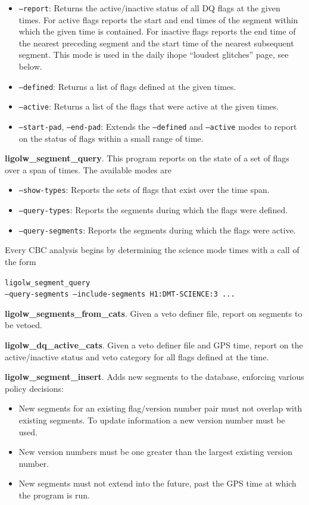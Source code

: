 \begin{itemize}
\item \texttt{--report}:  Returns the active/inactive status of all DQ flags at the
given times.  For active flags reports the start and end times of the
segment within which the given time is contained.  For inactive flags
reports the end time of the nearest preceding segment and the start
time of the nearest subsequent segment.  This mode is used in the
daily ihope ``loudest glitches'' page, see below.
\item \texttt{--defined}: Returns a list of flags defined at the
given times.
\item \texttt{--active}: Returns a list of the flags that were active
at the given times.
\item \texttt{--start-pad}, \texttt{--end-pad}: Extends the
\texttt{--defined} and \texttt{--active} modes to report on the status
of flags within a small range of time.
\end{itemize}


\textbf{ligolw\_segment\_query}.  This program reports on the state of a
set of flags over a span of times.  The available modes are

\begin{itemize}
\item \texttt{--show-types}: Reports the sets of flags that exist over
the time span.
\item \texttt{--query-types}: Reports the segments during which the
flags were defined.
\item \texttt{--query-segments}: Reports the segments during which the
flags were active.
\end{itemize}

Every CBC analysis begins by determining the science mode times with a
call of the form

\vspace*{5mm}
\texttt{ligolw\_segment\_query} \\
\hspace*{0.5in}\texttt{--query-segments --include-segments H1:DMT-SCIENCE:3 ...}
\vspace*{5mm}

\textbf{ligolw\_segments\_from\_cats}.  Given a veto definer file,
report on segments to be vetoed. 

\textbf{ligolw\_dq\_active\_cats}.  Given a veto definer file and GPS
time, report on the active/inactive status and veto category for all
flags defined at the time.

\textbf{ligolw\_segment\_insert}.  Adds new segments to the database,
enforcing various policy decisions:
\begin{itemize}
\item New segments for an existing flag/version number pair must not overlap 
with existing segments.  To update information a new version number must be used.
\item New version numbers must be one greater than the largest
existing version number.
\item New segments must not extend into the future, past the GPS time
at which the program is run.
\end{itemize}


